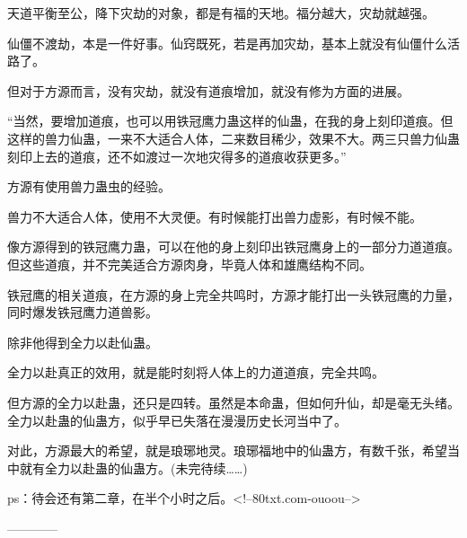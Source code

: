 \begin{this_body}
天道平衡至公，降下灾劫的对象，都是有福的天地。福分越大，灾劫就越强。

仙僵不渡劫，本是一件好事。仙窍既死，若是再加灾劫，基本上就没有仙僵什么活路了。

但对于方源而言，没有灾劫，就没有道痕增加，就没有修为方面的进展。

“当然，要增加道痕，也可以用铁冠鹰力蛊这样的仙蛊，在我的身上刻印道痕。但这样的兽力仙蛊，一来不大适合人体，二来数目稀少，效果不大。两三只兽力仙蛊刻印上去的道痕，还不如渡过一次地灾得多的道痕收获更多。”

方源有使用兽力蛊虫的经验。

兽力不大适合人体，使用不大灵便。有时候能打出兽力虚影，有时候不能。

像方源得到的铁冠鹰力蛊，可以在他的身上刻印出铁冠鹰身上的一部分力道道痕。但这些道痕，并不完美适合方源肉身，毕竟人体和雄鹰结构不同。

铁冠鹰的相关道痕，在方源的身上完全共鸣时，方源才能打出一头铁冠鹰的力量，同时爆发铁冠鹰力道兽影。

除非他得到全力以赴仙蛊。

全力以赴真正的效用，就是能时刻将人体上的力道道痕，完全共鸣。

但方源的全力以赴蛊，还只是四转。虽然是本命蛊，但如何升仙，却是毫无头绪。全力以赴蛊的仙蛊方，似乎早已失落在漫漫历史长河当中了。

对此，方源最大的希望，就是琅琊地灵。琅琊福地中的仙蛊方，有数千张，希望当中就有全力以赴蛊的仙蛊方。(未完待续……)

ps：待会还有第二章，在半个小时之后。<!--80txt.com-ouoou-->

------------

\end{this_body}

